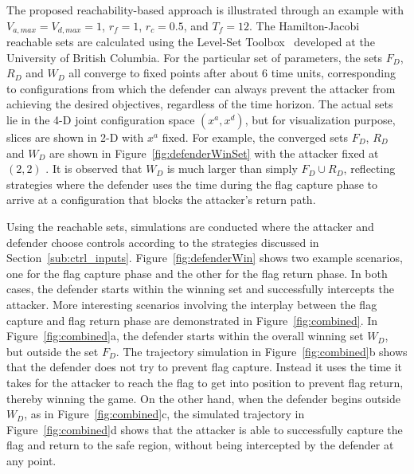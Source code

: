 \documentclass[letterpaper, 10 pt, conference]{ieeeconf}  %
\numberwithin{algorithm}{section}
\begin{document}
The proposed reachability-based approach is illustrated through an example with $V_{a,max}=V_{d,max}=1$, $r_f = 1$, $r_c = 0.5$, and $T_f = 12$. The Hamilton-Jacobi reachable sets are calculated using the Level-Set Toolbox~\cite{LSToolbox} developed at the University of British Columbia. For the particular set of parameters, the sets  $F_D$, $R_D$ and $W_D$ all converge to fixed points after about 6 time units, corresponding to configurations from which the defender can always prevent the attacker from achieving the desired objectives, regardless of the time horizon. The actual sets lie in the 4-D joint configuration space $(x^a,x^d)$, but for visualization purpose, slices are shown in 2-D with $x^a$ fixed. For example, the converged sets $F_D$, $R_D$ and $W_D$ are shown in Figure~\ref{fig:defenderWinSet} with the attacker fixed at $(2,2)$ . It is observed that $W_D$ is much larger than simply $F_D \cup R_D$, reflecting strategies where the defender uses the time during the flag capture phase to arrive at a configuration that blocks the attacker's return path.

Using the reachable sets, simulations are conducted where the attacker and defender choose controls according to the strategies discussed in Section~\ref{sub:ctrl_inputs}. Figure~\ref{fig:defenderWin} shows two example scenarios, one for the flag capture phase and the other for the flag return phase. In both cases, the defender starts within the winning set and successfully intercepts the attacker. More interesting scenarios involving the interplay between the flag capture and flag return phase are demonstrated in Figure~\ref{fig:combined}. In Figure~\ref{fig:combined}a, the defender starts within the overall winning set $W_D$, but outside the set $F_D$. The trajectory simulation in Figure~\ref{fig:combined}b shows that the defender does not try to prevent flag capture. Instead it uses the time it takes for the attacker to reach the flag to get into position to prevent flag return, thereby winning the game. On the other hand, when the defender begins outside $W_D$, as in Figure~\ref{fig:combined}c, the simulated trajectory in Figure~\ref{fig:combined}d shows that the attacker is able to successfully capture the flag and return to the safe region, without being intercepted by the defender at any point.   

\end{document}
